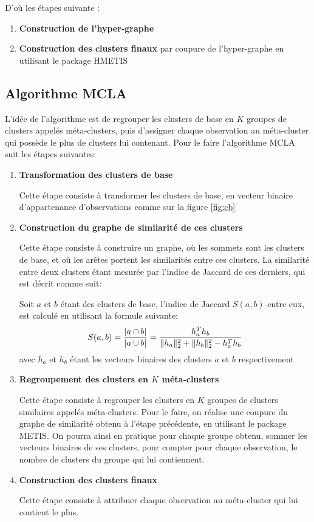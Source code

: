 \documentclass[12pt, french, latin.medieval, a4paper]{report}
\begin{document}
	D'où les étapes suivante :
	\begin{enumerate}
    	\item \textbf{Construction de l'hyper-graphe}
    	\item \textbf{Construction des clusters finaux} par coupure de l'hyper-graphe en utilisant le package HMETIS
	\end{enumerate}


	\subsection{Algorithme MCLA}
	L'idée de l'algorithme est de regrouper les clusters de base en $K$ groupes de clusters appelés méta-clusters, puis d'assigner chaque observation au méta-cluster qui possède le plus de clusters lui contenant.
	Pour le faire l'algorithme MCLA suit les étapes suivantes:
    
	\begin{enumerate}
    	\item \textbf{Transformation des clusters de base}
     
    	Cette étape consiste à transformer les clusters de base, en vecteur binaire d'appartenance d’observations comme sur la figure \ref{fig:cb}

    	\item \textbf{Construction du graphe de similarité de ces clusters}
    
    	Cette étape consiste à construire un graphe, où les sommets sont les clusters de base, et où les arêtes portent les similarités entre ces clusters.
    	La similarité entre deux clusters étant mesurée par l'indice de Jaccard de ces derniers, qui est décrit comme suit:
   	 
    	Soit $a$ et $b$ étant des clusters de base, l'indice de Jaccard $S(a, b)$ entre eux, est calculé en utilisant la formule suivante:
    	\begin{equation}
   		 S(a, b) = \frac{|a \cap b|}{|a \cup b|} = \frac{h_a^{\small{T}} h_b}{\|h_a\|_2^2 + \|h_b\|_2^2 - h_a^{\small{T}} h_b}
   	 \end{equation}
    	avec $h_a$ et $h_b$ étant les vecteurs binaires des clusters $a$ et $b$ respectivement

    	\item \textbf{Regroupement des clusters en $K$ méta-clusters}
   	 
    	Cette étape consiste à regrouper les clusters en $K$ groupes de clusters similaires appelés méta-clusters.
    	Pour le faire, on réalise une coupure du graphe de similarité obtenu à l'étape précédente, en utilisant le package METIS.
    	On pourra ainsi en pratique pour chaque groupe obtenu, sommer les vecteurs binaires de ses clusters, pour compter pour chaque observation, le nombre de clusters du groupe qui lui contiennent.

    	\item \textbf{Construction des clusters finaux}
   	 
    	Cette étape consiste à attribuer chaque observation au méta-cluster qui lui contient le plus.

	\end{enumerate}
\end{document}
